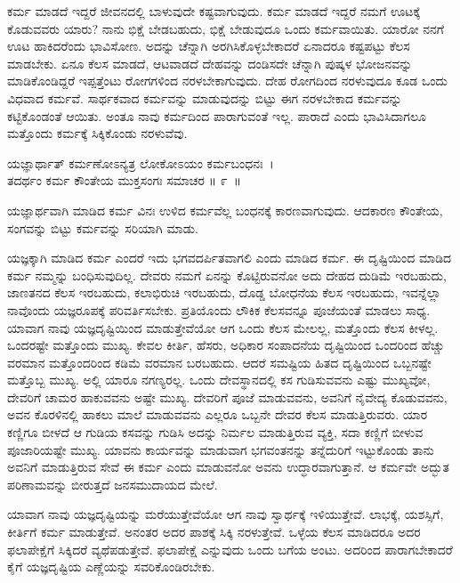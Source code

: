ಕರ್ಮ ಮಾಡದೆ ಇದ್ದರೆ ಜೀವನದಲ್ಲಿ ಬಾಳುವುದೇ ಕಷ್ಟವಾಗುವುದು. ಕರ್ಮ ಮಾಡದೆ ಇದ್ದರೆ ನಮಗೆ ಊಟಕ್ಕೆ ಕೊಡುವವರು ಯಾರು? ನಾನು ಭಿಕ್ಷೆ ಬೇಡಬಹುದು, ಭಿಕ್ಷೆ ಬೇಡುವುದೂ ಒಂದು ಕರ್ಮವಾಯಿತು. ಯಾರೋ ನನಗೆ ಊಟ ಹಾಕಿದರೆಂದು ಭಾವಿಸೋಣ. ಅದನ್ನು ಚೆನ್ನಾಗಿ ಅರಗಿಸಿಕೊಳ್ಳಬೇಕಾದರೆ ಏನಾದರೂ ಕಷ್ಟಪಟ್ಟು ಕೆಲಸ ಮಾಡಬೇಕು. ಏನೂ ಕೆಲಸ ಮಾಡದೆ, ಆಟವಾಡದೆ ದೇಹವನ್ನು ದಂಡಿಸದೇ ಚೆನ್ನಾಗಿ ಪುಷ್ಕಳ ಭೋಜನವನ್ನು ಮಾಡಿಕೊಂಡಿದ್ದರೆ ಇಪ್ಪತ್ತೆಂಟು ರೋಗಗಳಿಂದ ನರಳಬೇಕಾಗುವುದು. ದೇಹ ರೋಗದಿಂದ ನರಳುವುದೂ ಕೂಡ ಒಂದು ವಿಧವಾದ ಕರ್ಮವೆ. ಸಾರ್ಥಕವಾದ ಕರ್ಮವನ್ನು ಮಾಡುವುದನ್ನು ಬಿಟ್ಟು ಈಗ ನರಳಬೇಕಾದ ಕರ್ಮವನ್ನು ಕಟ್ಟಿಕೊಂಡಂತೆ ಆಯಿತು. ಅಂತೂ ನಾವು ಕರ್ಮದಿಂದ ಪಾರಾಗುವಂತೆ ಇಲ್ಲ. ಪಾರಾದೆ ಎಂದು ಭಾವಿಸಿದಾಗಲೂ ಮತ್ತೊಂದು ಕರ್ಮಕ್ಕೆ ಸಿಕ್ಕಿಕೊಂಡು ನರಳುವೆವು.

\begin{shloka}
ಯಜ್ಞಾರ್ಥಾತ್ ಕರ್ಮಣೋಽನ್ಯತ್ರ ಲೋಕೋಽಯಂ ಕರ್ಮಬಂಧನಃ~।\\ತದರ್ಥಂ ಕರ್ಮ ಕೌಂತೇಯ ಮುಕ್ತಸಂಗಃ ಸಮಾಚರ \hfill॥ ೯~॥
\end{shloka}

\begin{artha}
ಯಜ್ಞಾರ್ಥವಾಗಿ ಮಾಡಿದ ಕರ್ಮ ವಿನಃ ಉಳಿದ ಕರ್ಮವೆಲ್ಲ ಬಂಧನಕ್ಕೆ ಕಾರಣವಾಗುವುದು. ಆದಕಾರಣ ಕೌಂತೇಯ, ಸಂಗವನ್ನು ಬಿಟ್ಟು ಕರ್ಮವನ್ನು ಸರಿಯಾಗಿ ಮಾಡು.
\end{artha}

ಯಜ್ಞಕ್ಕಾಗಿ ಮಾಡಿದ ಕರ್ಮ ಎಂದರೆ ಇದು ಭಗವದರ್ಪಿತವಾಗಲಿ ಎಂದು ಮಾಡಿದ ಕರ್ಮ. ಈ ದೃಷ್ಟಿಯಿಂದ ಮಾಡಿದ ಕರ್ಮ ನಮ್ಮನ್ನು ಬಂಧಿಸುವುದಿಲ್ಲ. ದೇವರು ನಮಗೆ ಏನನ್ನು ಕೊಟ್ಟಿರುವನೋ ಅದು ದೇಹದ ದುಡಿಮೆ ಇರಬಹುದು, ಜಾಣತನದ ಕೆಲಸ ಇರಬಹುದು, ಕಲಾಭಿರುಚಿ ಇರಬಹುದು, ದೊಡ್ಡ ಬೋಧನೆಯ ಕೆಲಸ ಇರಬಹುದು, ಇವನ್ನೆಲ್ಲಾ ನಾವೊಂದು ಯಜ್ಞರೂಪಕ್ಕೆ ಪರಿವರ್ತಿಸಬೇಕು. ಪ್ರತಿಯೊಂದು ಲೌಕಿಕ ಕೆಲಸವನ್ನೂ ಪೂಜೆಯಂತೆ ಮಾಡಲು ಸಾಧ್ಯ. ಯಾವಾಗ ನಾವು ಯಜ್ಞದೃಷ್ಟಿಯಿಂದ ಮಾಡುತ್ತೇವೆಯೋ ಆಗ ಒಂದು ಕೆಲಸ ಮೇಲಲ್ಲ, ಮತ್ತೊಂದು ಕೆಲಸ ಕೀಳಲ್ಲ. ಒಂದರಷ್ಟೇ ಮತ್ತೊಂದು ಮುಖ್ಯ. ಕೇವಲ ಕೀರ್ತಿ, ಹೆಸರು, ಅಧಿಕಾರ ಸಂಪಾದನೆಯ ದೃಷ್ಟಿಯಿಂದ ಒಂದರಿಂದ ಹೆಚ್ಚು ವರಮಾನ ಮತ್ತೊಂದರಿಂದ ಕಡಿಮೆ ವರಮಾನ ಬರಬಹುದು. ಆದರೆ ಸಮಷ್ಟಿಯ ಹಿತದ ದೃಷ್ಟಿಯಿಂದ ಒಬ್ಬನಷ್ಟೇ ಮತ್ತೊಬ್ಬ ಮುಖ್ಯ. ಅಲ್ಲಿ ಯಾರೂ ನಗಣ್ಯರಲ್ಲ. ಒಂದು ದೇವಸ್ಥಾನದಲ್ಲಿ ಕಸ ಗುಡಿಸುವವನು ಎಷ್ಟು ಮುಖ್ಯವೋ, ದೇವರಿಗೆ ಚಾಮರ ಹಾಕುವವನು ಅಷ್ಟೇ ಮುಖ್ಯ. ದೇವರಿಗೆ ಪೂಜೆ ಮಾಡುವವನು, ಅವನಿಗೆ ನೈವೇದ್ಯ ಕೊಡುವವನು, ಅವನ ಕೊರಳಿನಲ್ಲಿ ಹಾಕಲು ಮಾಲೆ ಮಾಡುವವನು ಎಲ್ಲರೂ ಒಬ್ಬನೇ ದೇವರ ಕೆಲಸ ಮಾಡುತ್ತಿರುವರು. ಯಾರ ಕಣ್ಣಿಗೂ ಬೀಳದೆ ಆ ಗುಡಿಯ ಕಸವನ್ನು ಗುಡಿಸಿ ಅದನ್ನು ನಿರ್ಮಲ ಮಾಡುತ್ತಿರುವ ವ್ಯಕ್ತಿ, ಸದಾ ಕಣ್ಣಿಗೆ ಬೀಳುವ ಪೂಜಾರಿಯಷ್ಟೇ ಮುಖ್ಯ. ಯಾವನು ಕಾರ್ಯವನ್ನು ಮಾಡುವಾಗ ಭಗವಂತನನ್ನು ತನ್ನೆದುರಿಗೆ ಇಟ್ಟುಕೊಂಡು ತಾನು ಅವನಿಗೆ ಮಾಡುತ್ತಿರುವ ಸೇವೆ ಈ ಕರ್ಮ ಎಂದು ಮಾಡುವನೋ ಅವನು ಉದ್ಧಾರವಾಗುತ್ತಾನೆ. ಆ ಕರ್ಮವೇ ಅದ್ಭುತ ಪರಿಣಾಮವನ್ನು ಬೀರುತ್ತದೆ ಜನಸಮುದಾಯದ ಮೇಲೆ.

ಯಾವಾಗ ನಾವು ಯಜ್ಞದೃಷ್ಟಿಯನ್ನು ಮರೆಯುತ್ತೇವೆಯೋ ಆಗ ನಾವು ಸ್ವಾರ್ಥಕ್ಕೆ ಇಳಿಯುತ್ತೇವೆ. ಲಾಭಕ್ಕೆ, ಯಶಸ್ಸಿಗೆ, ಕೀರ್ತಿಗೆ ಕರ್ಮ ಮಾಡುತ್ತೇವೆ. ಅನಂತರ ಅದರ ಪಾಶಕ್ಕೆ ಸಿಕ್ಕಿ ನರಳುತ್ತೇವೆ. ಒಳ್ಳೆಯ ಕೆಲಸ ಮಾಡಿದರೂ ಅದರ ಫಲಾಪೇಕ್ಷೆಗೆ ಸಿಕ್ಕಿದರೆ ವ್ಯಥೆಪಡುತ್ತೇವೆ. ಫಲಾಪೇಕ್ಷೆ ಎನ್ನುವುದು ಒಂದು ಬಗೆಯ ಅಂಟು. ಅದರಿಂದ ಪಾರಾಗಬೇಕಾದರೆ ಕೈಗೆ ಯಜ್ಞದೃಷ್ಟಿಯ ಎಣ್ಣೆಯನ್ನು ಸವರಿಕೊಂಡಿರಬೇಕು.

